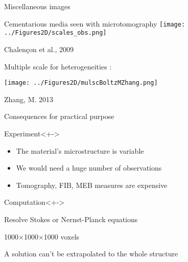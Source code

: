
\begin{frame}{Miscellaneous images}%
%
\begin{multicols}{2}
Cementarious media seen with microtomography
%
\texttt{[image: ../Figures2D/scales\_obs.png]}

\par
\footnotesize{Chalen\c con et al., 2009}

\columnbreak
Multiple scale for heterogeneities : 

\texttt{[image: ../Figures2D/mulscBoltzMZhang.png]}

\par
\footnotesize{Zhang, M. 2013}
\end{multicols}
%
%
\end{frame}

\begin{frame}{Consequences for practical purpose}
%
\begin{block}{Experiment}<+->
\begin{itemize}
\item<+-> The material's microstructure is variable
\item<+-> We would need a huge number of observations
\item<+-> Tomography, FIB, MEB measures are expensive
\end{itemize}
\end{block}
%
\begin{block}{Computation}<+->
\begin{description}
\item<+-> [Objectives] Resolve Stokes or Nernst-Planck equations
\item<+-> [High spatial resolution] 1000$\times$1000$\times$1000 voxels
\item<+-> [Small sample] A solution can't be extrapolated to the whole structure
\end{description}
\end{block}
%
\end{frame}